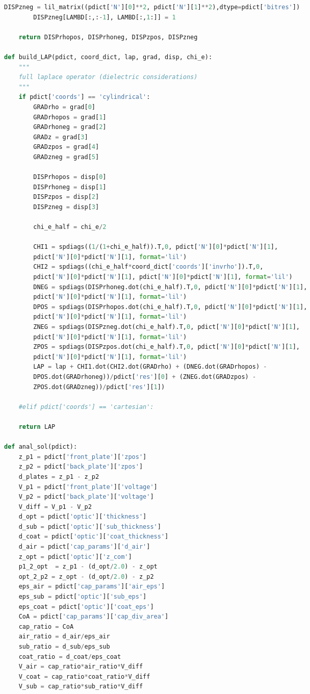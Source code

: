 \begin{spacing}{1.2}
\begin{lstlisting}[frame=single, language=Python]
        DISPzneg = lil_matrix((pdict['N'][0]**2, pdict['N'][1]**2),dtype=pdict['bitres'])
        DISPzneg[LAMBD[:,:-1], LAMBD[:,1:]] = 1
        
    return DISPrhopos, DISPrhoneg, DISPzpos, DISPzneg
             
def build_LAP(pdict, coord_dict, lap, grad, disp, chi_e):
    """
    full laplace operator (dielectric considerations)
    """
    if pdict['coords'] == 'cylindrical':
        GRADrho = grad[0]
        GRADrhopos = grad[1]
        GRADrhoneg = grad[2]
        GRADz = grad[3]
        GRADzpos = grad[4]
        GRADzneg = grad[5]
        
        DISPrhopos = disp[0]
        DISPrhoneg = disp[1]
        DISPzpos = disp[2]
        DISPzneg = disp[3]
    
        chi_e_half = chi_e/2

        CHI1 = spdiags((1/(1+chi_e_half)).T,0, pdict['N'][0]*pdict['N'][1], 
	    pdict['N'][0]*pdict['N'][1], format='lil')
        CHI2 = spdiags((chi_e_half*coord_dict['coords']['invrho']).T,0, 
	    pdict['N'][0]*pdict['N'][1], pdict['N'][0]*pdict['N'][1], format='lil')
        DNEG = spdiags(DISPrhoneg.dot(chi_e_half).T,0, pdict['N'][0]*pdict['N'][1], 
	    pdict['N'][0]*pdict['N'][1], format='lil')
        DPOS = spdiags(DISPrhopos.dot(chi_e_half).T,0, pdict['N'][0]*pdict['N'][1], 
	    pdict['N'][0]*pdict['N'][1], format='lil')
        ZNEG = spdiags(DISPzneg.dot(chi_e_half).T,0, pdict['N'][0]*pdict['N'][1], 
	    pdict['N'][0]*pdict['N'][1], format='lil')
        ZPOS = spdiags(DISPzpos.dot(chi_e_half).T,0, pdict['N'][0]*pdict['N'][1], 
	    pdict['N'][0]*pdict['N'][1], format='lil')
        LAP = lap + CHI1.dot(CHI2.dot(GRADrho) + (DNEG.dot(GRADrhopos) - 
	    DPOS.dot(GRADrhoneg))/pdict['res'][0] + (ZNEG.dot(GRADzpos) - 
	    ZPOS.dot(GRADzneg))/pdict['res'][1]) 
        
    #elif pdict['coords'] == 'cartesian':
        
    return LAP

def anal_sol(pdict):
    z_p1 = pdict['front_plate']['zpos']
    z_p2 = pdict['back_plate']['zpos']
    d_plates = z_p1 - z_p2
    V_p1 = pdict['front_plate']['voltage']
    V_p2 = pdict['back_plate']['voltage']
    V_diff = V_p1 - V_p2
    d_opt = pdict['optic']['thickness']
    d_sub = pdict['optic']['sub_thickness']
    d_coat = pdict['optic']['coat_thickness']
    d_air = pdict['cap_params']['d_air']
    z_opt = pdict['optic']['z_com']
    p1_2_opt  = z_p1 - (d_opt/2.0) - z_opt
    opt_2_p2 = z_opt - (d_opt/2.0) - z_p2
    eps_air = pdict['cap_params']['air_eps']
    eps_sub = pdict['optic']['sub_eps']   
    eps_coat = pdict['optic']['coat_eps']
    CoA = pdict['cap_params']['cap_div_area']
    cap_ratio = CoA
    air_ratio = d_air/eps_air
    sub_ratio = d_sub/eps_sub
    coat_ratio = d_coat/eps_coat
    V_air = cap_ratio*air_ratio*V_diff
    V_coat = cap_ratio*coat_ratio*V_diff
    V_sub = cap_ratio*sub_ratio*V_diff


\end{lstlisting}
\end{spacing}
